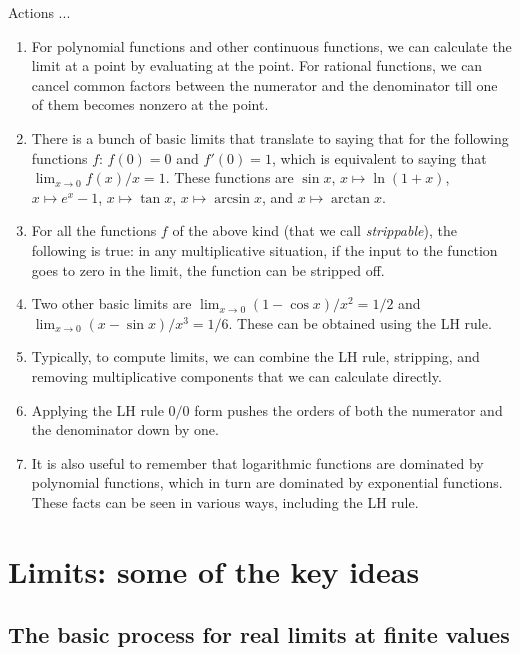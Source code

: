 \documentclass{amsart}
\begin{document}
Actions ...

\begin{enumerate}
\item For polynomial functions and other continuous functions, we can
  calculate the limit at a point by evaluating at the point. For
  rational functions, we can cancel common factors between the
  numerator and the denominator till one of them becomes nonzero at
  the point.
\item There is a bunch of basic limits that translate to saying that
  for the following functions $f$: $f(0) = 0$ and $f'(0) = 1$, which
  is equivalent to saying that $\lim_{x \to 0} f(x)/x = 1$. These
  functions are $\sin x$, $x \mapsto \ln(1 + x)$, $x \mapsto e^x - 1$,
  $x \mapsto \tan x$, $x \mapsto \arcsin x$, and $x \mapsto \arctan
  x$.
\item For all the functions $f$ of the above kind (that we call {\em
  strippable}), the following is true: in any multiplicative
  situation, if the input to the function goes to zero in the limit,
  the function can be stripped off.
\item Two other basic limits are $\lim_{x \to 0} (1 - \cos x)/x^2 =
  1/2$ and $\lim_{x \to 0} (x - \sin x)/x^3 = 1/6$. These can be
  obtained using the LH rule.
\item Typically, to compute limits, we can combine the LH rule,
  stripping, and removing multiplicative components that we can
  calculate directly.
\item Applying the LH rule $0/0$ form pushes the orders of both the
  numerator and the denominator down by one.
\item It is also useful to remember that logarithmic functions are
  dominated by polynomial functions, which in turn are dominated by
  exponential functions. These facts can be seen in various ways,
  including the LH rule.
\end{enumerate}

\section{Limits: some of the key ideas}

\subsection{The basic process for real limits at finite values}
\end{document}
